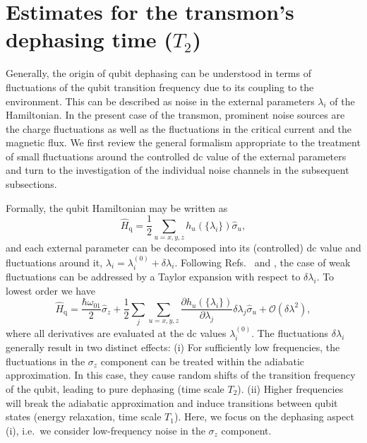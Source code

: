 \documentclass[twocolumn,amsmath,amssymb,floatfix,pra,showpacs,eqsecnum,footinbib,superscriptaddress]{revtex4}
\newcommand{\be}{\begin{equation}}
\newcommand{\ee}{\end{equation}}
\begin{document}
\section{Estimates for the transmon's dephasing time ($T_2$)\label{sec:dephasing}}
Generally, the origin of qubit dephasing can be understood in terms of fluctuations of the qubit transition frequency due to its coupling  to the environment. This can be described as noise in the external parameters $\lambda_i$ of the Hamiltonian. In the present case of the transmon, prominent noise sources are the charge fluctuations as well as the fluctuations in the critical current and the magnetic flux. We first review the general formalism appropriate to the treatment of small fluctuations around the controlled dc value of the external parameters and turn to the investigation of the individual noise channels in the subsequent subsections.

Formally, the qubit Hamiltonian may be written as
\be
\hat{H}_\text{q}= \frac{1}{2}\sum_{u=x,y,z} h_u(\{\lambda_i\})\hat{\sigma}_u,
\ee
and each external parameter can be decomposed into its (controlled) dc value and fluctuations around it, $\lambda_i=\lambda_{i}^{(0)}+\delta\lambda_i$.  Following Refs.\ \cite{makhlin2} and \cite{ithier}, the case 
of weak fluctuations can be addressed by a  Taylor expansion with respect to $\delta\lambda_i$. To lowest order we have
\be\label{hexp}
\hat{H}_\text{q}= \frac{\hbar \omega_{01}}{2}\hat{\sigma}_z + \frac{1}{2}\sum_{j}\sum_{u=x,y,z}  \frac{\partial h_u(\{\lambda_i\})}{\partial \lambda_j}\delta\lambda_j \hat{\sigma}_u +\mathcal{O}(\delta\lambda^2),
\ee
where all derivatives are evaluated at the dc values $\lambda_i^{(0)}$. The fluctuations $\delta\lambda_i$ generally result in two distinct effects: (i) For sufficiently low frequencies, the fluctuations in the $\sigma_z$ component can be treated within the adiabatic approximation. In this case, they cause random shifts of the transition frequency of the qubit, leading to pure dephasing (time scale $T_2$). (ii) Higher frequencies will break the adiabatic approximation and induce transitions between qubit states (energy relaxation, time scale $T_1$). 
  Here, we focus on the dephasing aspect (i), i.e.\ we consider low-frequency noise in the $\sigma_z$ component. 
\end{document}
